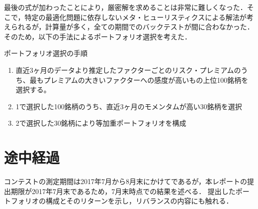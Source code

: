 \documentclass[11pt]{jreport}
\begin{document}
最後の式が加わったことにより，厳密解を求めることは非常に難しくなった．そこで，特定の最適化問題に依存しないメタ・ヒューリスティクスによる解法が考えられるが，計算量が多く，全ての期間でのバックテストが間に合わなかった．そのため，以下の手法によるポートフォリオ選択を考えた．

\begin{itembox}[l]{ポートフォリオ選択の手順}
\begin{enumerate}
\item 直近3ヶ月のデータより推定したファクターごとのリスク・プレミアムのうち、最もプレミアムの大きいファクターへの感度が高いもの上位100銘柄を選択する。
\item 1で選択した100銘柄のうち、直近3ヶ月のモメンタムが高い30銘柄を選択
\item 2で選択した30銘柄により等加重ポートフォリオを構成
\end{enumerate}
\end{itembox}

\chapter{途中経過}
コンテストの測定期間は2017年7月から8月末にかけてであるが，本レポートの提出期限が2017年7月末であるため，7月末時点での結果を述べる．
提出したポートフォリオの構成とそのリターンを示し，リバランスの内容にも触れる．
\end{document}
